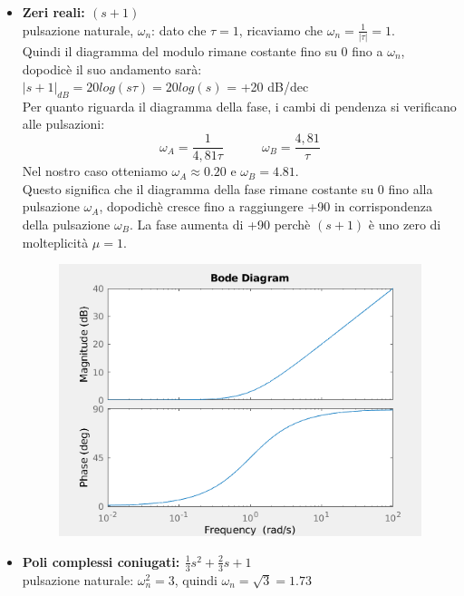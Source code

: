 \documentclass[12pt,a4paper]{article}
\begin{document}
\begin{itemize}
\begin{figure}[h!]
		\end{figure}
		\item \textbf{Zeri reali: $(s+1)$}\\
		pulsazione naturale, $\omega_n$: dato che $\tau = 1$, ricaviamo che $\omega_n = \frac{1}{|\tau|} = 1$.\\Quindi il diagramma del modulo rimane costante fino su 0 fino a $\omega_n$, dopodic\`e il suo andamento sar\`a:\\
		$|s+1|_{dB} = 20log(s\tau) = 20log(s)$ = +20 dB/dec\\
		Per quanto riguarda il diagramma della fase, i cambi di pendenza si verificano alle pulsazioni:\\
		\[
		\omega_A = \frac{1}{4,81\tau}\quad\quad\quad\omega_B = \frac{4,81}{\tau}
		\]
		Nel nostro caso otteniamo $\omega_A \approx 0.20$ e $\omega_B = 4.81$.\\Questo significa che il diagramma della fase rimane costante su 0 fino alla pulsazione $\omega_A$, dopodich\`e cresce fino a raggiungere +90 in corrispondenza della pulsazione $\omega_B$.
		La fase aumenta di +90 perch\`e $(s+1)$ \`e uno zero di molteplicit\`a $\mu = 1$.
		\newpage
		\begin{figure}[h!]
			\centering
			\includegraphics[scale=0.5]{./images/bode42_3.png}
		\end{figure}
		\item \textbf{Poli complessi coniugati: $\frac{1}{3}s^2 + \frac{2}{3}s + 1$}\vspace{5px}\\
		pulsazione naturale: $\omega_n^2 = 3$, quindi $\omega_n = \sqrt{3} = 1.73$\\

\end{itemize}
\end{document}
